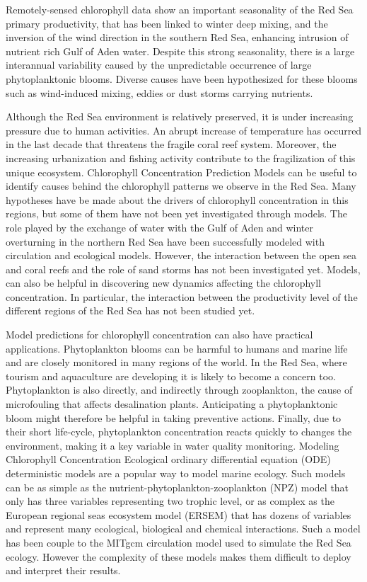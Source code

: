 Remotely-sensed chlorophyll data show an important seasonality of the Red Sea primary productivity, that has been linked to winter deep mixing, and the inversion of the wind direction in the southern Red Sea, enhancing intrusion of nutrient rich Gulf of Aden water. Despite this strong seasonality, there is a large interannual variability caused by the unpredictable occurrence of large phytoplanktonic blooms. Diverse causes have been hypothesized for these blooms such as wind-induced mixing, eddies or dust storms carrying nutrients. 

Although the Red Sea environment is relatively preserved, it is under increasing pressure due to human activities. An abrupt increase of temperature has occurred in the last decade that threatens the fragile coral reef system. Moreover, the increasing urbanization and fishing activity contribute to the fragilization of this unique ecosystem.
Chlorophyll Concentration Prediction
Models can be useful to identify causes behind the chlorophyll patterns we observe in the Red Sea. Many hypotheses have be made about the drivers of chlorophyll concentration in this regions, but some of them have not been yet investigated through models. The role played by the exchange of water with the Gulf of Aden and winter overturning in the northern Red Sea have been successfully modeled with circulation and ecological models. However, the interaction between the open sea and coral reefs and the role of sand storms has not been investigated yet. Models, can also be helpful in discovering new dynamics affecting the chlorophyll concentration. In particular, the interaction between the productivity level of the different regions of the Red Sea has not been studied yet.  

Model predictions for chlorophyll concentration can also have practical applications. Phytoplankton blooms can be harmful to humans and marine life and are closely monitored in many regions of the world. In the Red Sea, where tourism and aquaculture are developing it is likely to become a concern too. Phytoplankton is also directly, and indirectly through zooplankton, the cause of microfouling that affects desalination plants. Anticipating a phytoplanktonic bloom might therefore be helpful in taking preventive actions. Finally, due to their short life-cycle, phytoplankton concentration reacts quickly to changes the environment, making it a  key variable in water quality monitoring.
Modeling Chlorophyll Concentration
Ecological ordinary differential equation (ODE) deterministic models are a popular way to model marine ecology. Such models can be as simple as the nutrient-phytoplankton-zooplankton (NPZ) model that only has three variables representing two trophic level, or as complex as the European regional seas ecosystem model (ERSEM) that has dozens of variables and represent many ecological, biological and chemical interactions. Such a model has been couple to the MITgcm circulation model used to simulate the Red Sea ecology. However the complexity of these models makes them difficult to deploy and interpret their results. 

